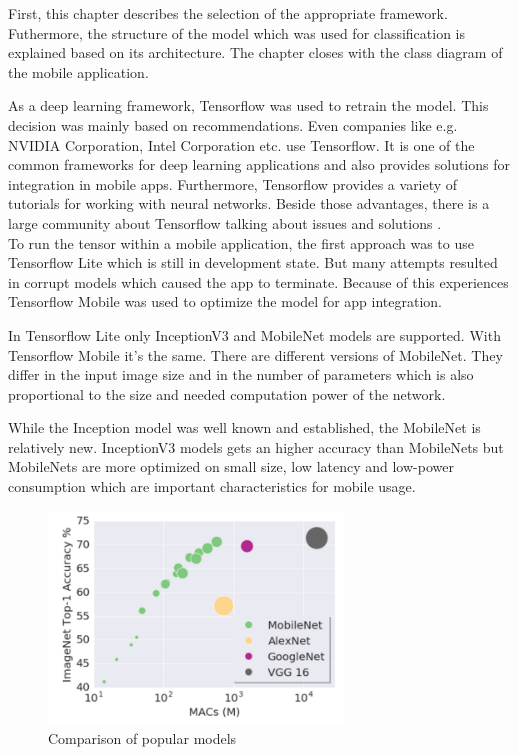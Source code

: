 First, this chapter describes the selection of the appropriate framework. Futhermore, the structure of the model which was used for classification is explained based on its architecture. The chapter closes with the class diagram of the mobile application.

As a deep learning framework, Tensorflow was used to retrain the model. This decision was mainly based on recommendations. Even companies like e.g. NVIDIA Corporation, Intel Corporation etc. use Tensorflow. It is one of the common frameworks for deep learning applications and also provides solutions for integration in mobile apps. Furthermore, Tensorflow provides a variety of tutorials for working with neural networks. Beside those advantages, there is a large community about Tensorflow talking about issues and solutions \citep{Tensorflow2017}. \\

To run the tensor within a mobile application, the first approach was to use Tensorflow Lite which is still in development state. But many attempts resulted in corrupt models which caused the app to terminate. Because of this experiences Tensorflow Mobile was used to optimize the model for app integration. 
		
In Tensorflow Lite only InceptionV3 and MobileNet models are supported. With Tensorflow Mobile it's the same. There are different versions of MobileNet. They differ in the input image size and in the number of parameters which is also proportional to the size and needed computation power of the network.

While the Inception model was well known and established, the MobileNet is relatively new. InceptionV3 models gets an higher accuracy than MobileNets but MobileNets are more optimized on small size, low latency and low-power consumption which are important characteristics for mobile usage. \citep{TensorFlowMobileNet} \\

\begin{figure}[htbp]
\centering
\includegraphics[width=0.7\textwidth]{includes/mobilenetv1}
\caption[Comparison of popular models]{Comparison of popular models \citep{TensorFlowMobileNet}}
\label{fig:mobilenetv1}
\end{figure} 


